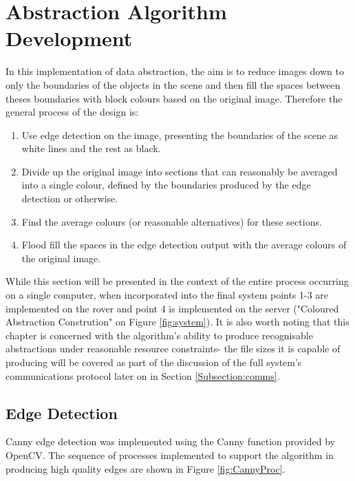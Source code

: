 \chapter{Abstraction Algorithm Development}
\label{chapter:abstract}

In this implementation of data abstraction, the aim is to reduce images down to only the boundaries of the objects in the scene and then fill the spaces between theses boundaries with block colours based on the original image. Therefore the general process of the design is:
\begin{enumerate}
    \item Use edge detection on the image, presenting the boundaries of the scene as white lines and the rest as black. 
    \item Divide up the original image into sections that can reasonably be averaged into a single colour, defined by the boundaries produced by the edge detection or otherwise.
    \item Find the average colours (or reasonable alternatives) for these sections.
    \item Flood fill the spaces in the edge detection output with the average colours of the original image.
\end{enumerate}
While this section will be presented in the context of the entire process occurring on a single computer, when incorporated into the final system points 1-3 are implemented on the rover and point 4 is implemented on the server ("Coloured Abstraction Constrution" on Figure \ref{fig:system}). It is also worth noting that this chapter is concerned with the algorithm's ability to produce recognisable abstractions under reasonable resource constraints- the file sizes it is capable of producing will be covered as part of the discussion of the full system's communications protocol later on in Section \ref{Subsection:comms}.

\section{Edge Detection}

Canny edge detection was implemented using the Canny function provided by OpenCV. The sequence of processes implemented to support the algorithm in producing high quality edges are shown in Figure \ref{fig:CannyProc}. 

